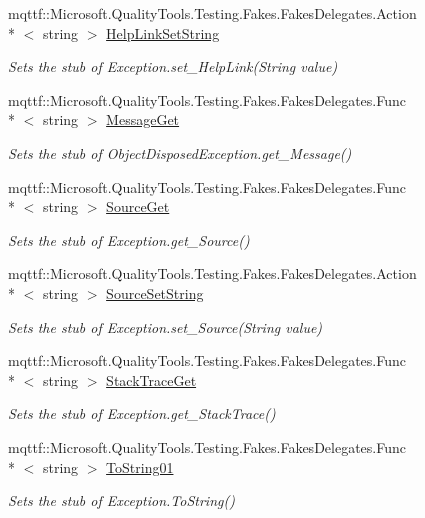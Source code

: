 \begin{DoxyCompactItemize}
mqttf\-::\-Microsoft.\-Quality\-Tools.\-Testing.\-Fakes.\-Fakes\-Delegates.\-Action\\*
$<$ string $>$ \hyperlink{class_system_1_1_fakes_1_1_stub_object_disposed_exception_a870ee6aa19f1fd732bc2e9db2c9fb9ee}{Help\-Link\-Set\-String}
\begin{DoxyCompactList}\small\item\em Sets the stub of Exception.\-set\-\_\-\-Help\-Link(\-String value)\end{DoxyCompactList}\item 
mqttf\-::\-Microsoft.\-Quality\-Tools.\-Testing.\-Fakes.\-Fakes\-Delegates.\-Func\\*
$<$ string $>$ \hyperlink{class_system_1_1_fakes_1_1_stub_object_disposed_exception_afa01e5ff1d90740446310bbeef0f8dd4}{Message\-Get}
\begin{DoxyCompactList}\small\item\em Sets the stub of Object\-Disposed\-Exception.\-get\-\_\-\-Message()\end{DoxyCompactList}\item 
mqttf\-::\-Microsoft.\-Quality\-Tools.\-Testing.\-Fakes.\-Fakes\-Delegates.\-Func\\*
$<$ string $>$ \hyperlink{class_system_1_1_fakes_1_1_stub_object_disposed_exception_afc465e7606a0fd33c0c6851cfda60d5e}{Source\-Get}
\begin{DoxyCompactList}\small\item\em Sets the stub of Exception.\-get\-\_\-\-Source()\end{DoxyCompactList}\item 
mqttf\-::\-Microsoft.\-Quality\-Tools.\-Testing.\-Fakes.\-Fakes\-Delegates.\-Action\\*
$<$ string $>$ \hyperlink{class_system_1_1_fakes_1_1_stub_object_disposed_exception_a67b8e6a9a9becf24f4943846748e1b53}{Source\-Set\-String}
\begin{DoxyCompactList}\small\item\em Sets the stub of Exception.\-set\-\_\-\-Source(\-String value)\end{DoxyCompactList}\item 
mqttf\-::\-Microsoft.\-Quality\-Tools.\-Testing.\-Fakes.\-Fakes\-Delegates.\-Func\\*
$<$ string $>$ \hyperlink{class_system_1_1_fakes_1_1_stub_object_disposed_exception_a6f24418a64543113a611fdbaa9bf5b94}{Stack\-Trace\-Get}
\begin{DoxyCompactList}\small\item\em Sets the stub of Exception.\-get\-\_\-\-Stack\-Trace()\end{DoxyCompactList}\item 
mqttf\-::\-Microsoft.\-Quality\-Tools.\-Testing.\-Fakes.\-Fakes\-Delegates.\-Func\\*
$<$ string $>$ \hyperlink{class_system_1_1_fakes_1_1_stub_object_disposed_exception_a7dd232f82df2768c094703772113991c}{To\-String01}
\begin{DoxyCompactList}\small\item\em Sets the stub of Exception.\-To\-String()\end{DoxyCompactList}\end{DoxyCompactItemize}
